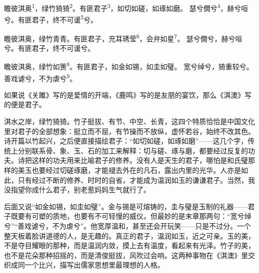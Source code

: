
\begin{poem}
瞻彼淇奥\textsuperscript{1}，绿竹猗猗\textsuperscript{2}。有匪君子\textsuperscript{3}，如切如磋，如琢如磨。
瑟兮僩兮\textsuperscript{4}，赫兮咺兮。有匪君子，终不可谖\textsuperscript{5}兮。

瞻彼淇奥，绿竹青青。有匪君子，充耳琇莹\textsuperscript{6}，会弁如星\textsuperscript{7}。
瑟兮僩兮，赫兮咺兮。有匪君子，终不可谖兮。

瞻彼淇奥，绿竹如箦\textsuperscript{8}。有匪君子，如金如锡，如圭如璧。
宽兮绰兮，猗重较兮。善戏谑兮，不为虐兮\textsuperscript{9}。
\end{poem}

\begin{annotations}
\end{annotations}

\begin{appreciation}
如果说《关雎》写的是爱情的开端，《鹿鸣》写的是友朋的宴饮，那么《淇澳》写的便是君子。

淇水之岸，绿竹猗猗。竹子挺拔、有节、中空、长青，这四个特质恰恰是中国文化里对君子的全部想象：挺立而不屈，有节操而不放纵，虚怀若谷，始终不改其色。诗开篇以竹起兴，之后便直接描绘君子：“如切如磋，如琢如磨”——这几个字，传统上分别联系骨、象、玉、石的加工来解释：切与磋、琢与磨，都要经过反复的功夫。诗把这样的功夫用来比喻君子的修养。没有人是天生的君子，哪怕是和氏璧那样的美玉也要经过切磋琢磨，才能褪去外在的凡石，露出内里的光华。人亦是如此，只有经过不断的修养、时时的自省，才能成为温润如玉的谦谦君子。当然，我没指望你成什么君子，别老惹妈妈生气就行了。

后面又说“如金如锡，如圭如璧”。金与锡是可熔铸的，圭与璧是玉制的礼器——君子既要有可塑的质地，也要有不可轻慢的威仪。但最妙的是末章那两句：“宽兮绰兮”“善戏谑兮，不为虐兮”。他宽厚温和，甚至还会开玩笑——只是不过分。一个整天板着脸讲道德的人，是无趣的。真正的君子，温润如玉，近之可亲。玉的美，不是夺目耀眼的那种，而是温润内敛，摸上去有温度，看起来有光泽。竹子的美，也不是花朵那种招摇的，而是清俊挺拔，风吹过会响。这两种事物在《淇澳》里交织成同一个比兴，描写出儒家思想里最理想的人格。
\end{appreciation}
